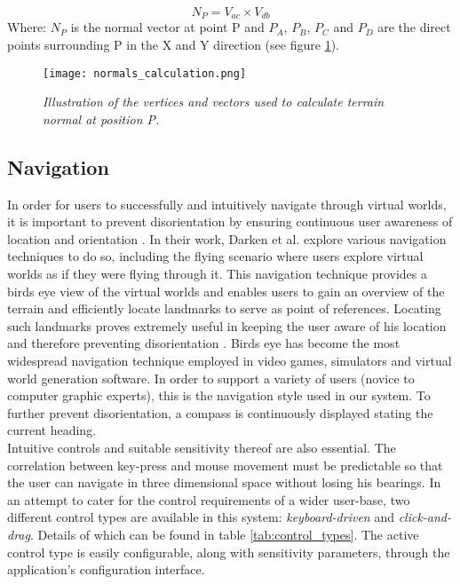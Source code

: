 \begin{equation} \label{eq:normals_calculation}
N_{P} = V_{ac} \times V_{db}
\end{equation}
Where: $N_{P}$ is the normal vector at point P and $P_{A}$, $P_{B}$, $P_{C}$ and $P_{D}$ are the direct points surrounding P in the X and Y direction (see figure \ref{fig:normals_calculation}).

\begin{figure}[h]
\center
	\texttt{[image: normals\_calculation.png]}
	\caption{\textit{Illustration of the vertices and vectors used to calculate terrain normal at position \textit{P}.}}
	\label{fig:normals_calculation}
\end{figure}

\subsection{Navigation}

In order for users to successfully and intuitively navigate through virtual worlds, it is important to prevent disorientation by ensuring continuous user awareness of location and orientation \cite{Darken1993}. 
In their work, Darken et al. \cite{Darken1993} explore various navigation techniques to do so, including the flying scenario where users explore virtual worlds as if they were flying through it. This navigation technique provides a birds eye view of the virtual worlds and enables users to gain an overview of the terrain and efficiently locate landmarks to serve as point of references. Locating such landmarks proves extremely useful in keeping the user aware of his location and therefore preventing disorientation \cite{Darken1993}. Birds eye has become the most widespread navigation technique employed in video games, simulators and virtual world generation software. In order to support a variety of users (novice to computer graphic experts), this is the navigation style used in our system. To further prevent disorientation, a compass is continuously displayed stating the current heading. \\

Intuitive controls and suitable sensitivity thereof are also essential. The correlation between key-press and mouse movement must be predictable so that the user can navigate in three dimensional space without losing his bearings. In an attempt to cater for the control requirements of a wider user-base, two different control types are available in this system: \textit{keyboard-driven} and \textit{click-and-drag}. Details of which can be found in table \ref{tab:control_types}. The active control type is easily configurable, along with sensitivity parameters, through the application's configuration interface.

